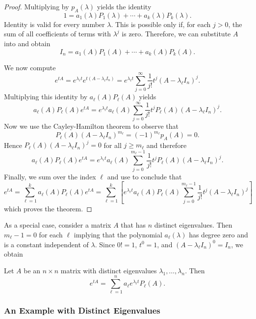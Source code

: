 \documentclass{ximera}
\begin{document}
\begin{proof} Multiplying  by $p_A(\lambda)$ yields the identity
\begin{equation}  \label{e:p=aP}
1 = a_1(\lambda)P_1(\lambda) + \cdots + a_k(\lambda)P_k(\lambda).
\end{equation}
Identity  is valid for every number $\lambda$.  This is 
possible only if, for each $j>0$, the sum of all coefficients of terms 
with $\lambda^j$ is zero.  Therefore, we can substitute $A$ into 
 and obtain
\begin{equation}  \label{e:p=AP}
I_n = a_1(A)P_1(A) + \cdots + a_k(A)P_k(A).
\end{equation}

We now compute 
\[
e^{tA}   =  e^{\lambda_\ell t}e^{t(A-\lambda_\ell I_n)} =  
e^{\lambda_\ell t}\sum_{j=0}^\infty\frac{1}{j!}t^j(A-\lambda_\ell I_n)^j.
\]
Multiplying this identity by $a_\ell(A)P_\ell(A)$ yields
\[
a_\ell(A)P_\ell(A)e^{tA} = e^{\lambda_\ell t}a_\ell(A)
\sum_{j=0}^\infty\frac{1}{j!}t^jP_\ell(A)(A-\lambda_\ell I_n)^j.
\]
Now we use the Cayley-Hamilton theorem to observe that 
\[
P_\ell(A)(A-\lambda_\ell I_n)^{m_\ell} = (-1)^{m_\ell}p_A(A) = 0.
\]
Hence $P_\ell(A)(A-\lambda_\ell I_n)^j=0$ for all $j\ge m_\ell$
and therefore
\[
a_\ell(A)P_\ell(A)e^{tA} = e^{\lambda_\ell t}a_\ell(A)
\sum_{j=0}^{m_\ell-1}\frac{1}{j!}t^jP_\ell(A)(A-\lambda_\ell I_n)^j.
\]
Finally, we sum over the index $\ell$ and use  to conclude that
\[
e^{tA} = \sum_{\ell=1}^ka_\ell(A)P_\ell(A)e^{tA} = 
\sum_{\ell=1}^k\left[ e^{\lambda_\ell t}a_\ell(A)P_\ell(A)
\sum_{j=0}^{m_\ell-1}\frac{1}{j!}t^j(A-\lambda_\ell I_n)^j \right]
\]
which proves the theorem.  \end{proof}  

As a special case, consider a matrix $A$ that has $n$ distinct
eigenvalues. Then $m_\ell-1=0$ for each $\ell$ implying that the polynomial
$a_\ell(\lambda)$ has degree zero and is a constant independent of $\lambda$. 
Since $0!=1$, $t^0=1$, and $(A-\lambda_\ell I_n)^0=I_n$, we obtain
\begin{cor} \label{T:etA0}
Let $A$ be an $n\times n$ matrix with distinct eigenvalues
$\lambda_1,\ldots,\lambda_n$. Then
\[
e^{tA} = \sum_{\ell=1}^n a_\ell e^{\lambda_\ell t} P_\ell(A).
\]
\end{cor}

\subsubsection*{An Example with Distinct Eigenvalues}
\end{document}
